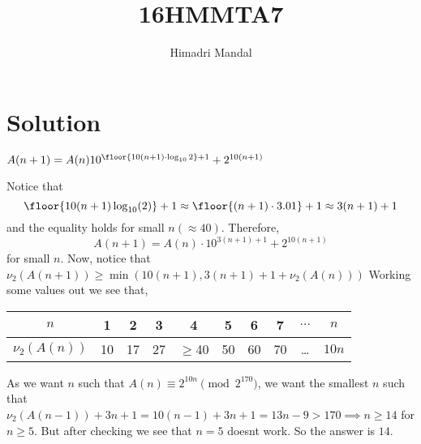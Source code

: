 \documentclass[11pt]{scrartcl}
\title{16HMMTA7}
\author{Himadri Mandal}
\begin{document}
\maketitle

\section{Solution}
\begin{soln}
  \raggedright
  $A(n+1) = A(n)10^{\floor{10(n+1) \cdot\log_{10}{2}}+1} + 2^{10(n+1)}$ 

  Notice that \[ \floor{10(n+1) \log_{10}(2)} + 1 \approx \floor{(n+1) \cdot 3.01} + 1 \approx 3(n+1)+1  \]
  and the equality holds for small $n(\approx 40)$. Therefore, 
  \[ A(n+1) = A(n) \cdot 10^{3(n+1)+1} + 2^{10(n+1)} \] for small $n$.
  Now, notice that $\nu_2(A(n+1)) \geq \min(10(n+1), 3(n+1)+1+\nu_2(A(n)))$ 
  Working some values out we see that, 
  \begin{table}[h!]
    \centering\begin{tabular}{||c | c c c c c c c c c||}
     \hline 
      $n$ & 1 & 2 & 3 & 4 & 5 & 6 & 7 & $\dots$ & $n$ \\
      \hline \hline  
      $\nu_2(A(n))$ & 10 & 17 & 27 & $\geq$40 & 50 & 60 & 70 & \dots & $10n$\\ 
      \hline
    \end{tabular}
  \end{table}

  As we want $n$ such that $A(n) \equiv 2^{10n} \pmod{2^{170}}$, we want the smallest $n$ such that 
  $\nu_2(A(n-1)) + 3n+1 = 10(n-1)+3n+1 = 13n-9> 170 \implies n \geq 14$ for $n \geq 5$. But after checking
  we see that $n=5$ doesnt work. So the answer is $14$.
\end{soln}
\end{document}
